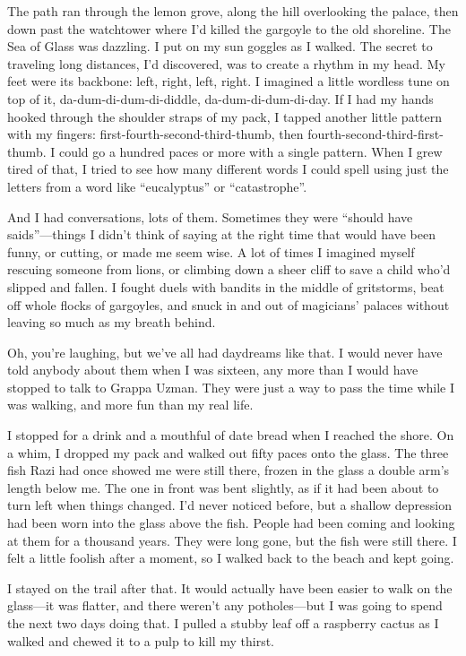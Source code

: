 The path ran through the lemon grove, along the hill overlooking the
palace, then down past the watchtower where I'd killed the gargoyle to
the old shoreline.  The Sea of Glass was dazzling.  I put on my sun
goggles as I walked.  The secret to traveling long distances, I'd
discovered, was to create a rhythm in my head.  My feet were its
backbone: left, right, left, right.  I imagined a little wordless tune
on top of it, da-dum-di-dum-di-diddle, da-dum-di-dum-di-day.  If I had
my hands hooked through the shoulder straps of my pack, I tapped
another little pattern with my fingers:
first-fourth-second-third-thumb, then fourth-second-third-first-thumb.
I could go a hundred paces or more with a single pattern.  When I grew
tired of that, I tried to see how many different words I could spell
using just the letters from a word like ``eucalyptus'' or ``catastrophe''.

And I had conversations, lots of them.  Sometimes they were ``should
have saids''---things I didn't think of saying at the right time that
would have been funny, or cutting, or made me seem wise.  A lot of
times I imagined myself rescuing someone from lions, or climbing down
a sheer cliff to save a child who'd slipped and fallen.  I fought
duels with bandits in the middle of gritstorms, beat off whole flocks
of gargoyles, and snuck in and out of magicians' palaces without
leaving so much as my breath behind.

Oh, you're laughing, but we've all had daydreams like that.  I would
never have told anybody about them when I was sixteen, any more than I
would have stopped to talk to Grappa Uzman.  They were just a way to
pass the time while I was walking, and more fun than my real life.

I stopped for a drink and a mouthful of date bread when I reached the
shore.  On a whim, I dropped my pack and walked out fifty paces onto
the glass.  The three fish Razi had once showed me were still there,
frozen in the glass a double arm's length below me.  The one in front
was bent slightly, as if it had been about to turn left when things
changed.  I'd never noticed before, but a shallow depression had been
worn into the glass above the fish.  People had been coming and
looking at them for a thousand years.  They were long gone, but the
fish were still there.  I felt a little foolish after a moment, so I
walked back to the beach and kept going.

I stayed on the trail after that.  It would actually have been easier
to walk on the glass---it was flatter, and there weren't any
potholes---but I was going to spend the next two days doing that.  I
pulled a stubby leaf off a raspberry cactus as I walked and chewed it
to a pulp to kill my thirst.

